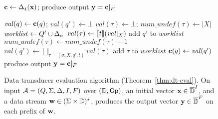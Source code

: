 \begin{figure}[t]
\vspace{-8pt}
\centering \footnotesize
\begin{algorithmic}

\State $\textbf{c} \gets \Delta_{\texttt{i}}(\textbf{x})$; produce output $\textbf{y} = \textbf{c}|_{F}$

        $\mathit{val}(q) \gets \textbf{c}(q)$;
        $\mathit{val}(q') \gets \bot$
    \EndFor
        $\mathit{val}(\tau) \gets \bot$;
        $\mathit{num\_undef}(\tau) \gets |X|$
    \EndFor
    \State $\mathit{worklist} \gets Q' \cup \Delta_\sigma$
            \State $\mathit{val}(\tau) \gets \llbracket t \rrbracket(\mathit{val}|_X)$
                add $q'$ to $\mathit{worklist}$
            \EndIf
                    $\mathit{num\_undef}(\tau) \gets \mathit{num\_undef}(\tau) - 1$
                \EndFor
            \EndIf
            \State $\mathit{val}(q') \gets \bigsqcup_{\tau = (\sigma, X, q', t)} \mathit{val}(\tau)$
                    add $\tau$ to $\mathit{worklist}$
                \EndIf
            \EndFor
        \EndIf
    \EndWhile
        $\textbf{c}(q) \gets \mathit{val}(q')$
    \EndFor
    \State produce output $\textbf{y} = \textbf{c}|_{F}$
\EndFor
\end{algorithmic}
\caption{Data transducer evaluation algorithm (Theorem~\ref{thm:dt-eval}). On input $\mathcal{A} = (Q, \Sigma, \Delta, I, F)$ over $(\mathbb{D}, \textsf{Op})$, an initial vector $\textbf{x} \in \overline{\mathbb{D}{}}^I$, and a data stream $\textbf{w} \in (\Sigma \times \mathbb{D})^*$, produces the output vector $\textbf{y} \in \overline{\mathbb{D}{}}^F$ on each prefix of $\textbf{w}$.
}
\label{fig:dt-eval-algorithm}
\end{figure}
